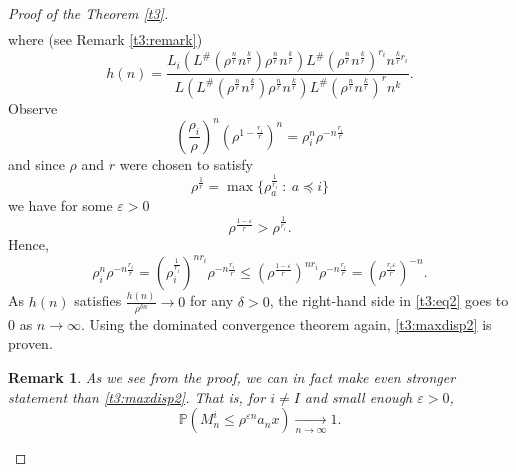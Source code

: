 \documentclass[12pt]{article}
\numberwithin{equation}{section}
\newtheorem{remark}[theorem]{Remark}
\begin{document}
\begin{proof}[Proof of the Theorem \ref{t3}]
\begin{align}
\end{align}
where (see Remark \ref{t3:remark}) \[
h(n) = \frac{ L_i\left( L^{\#}\left( \rho^{\frac n r} n^{\frac k r}\right)\rho^{\frac n r} n^{\frac k r}\right) L^{\#}\left( \rho^{\frac n r} n^{\frac k r}\right)^{r_i}n^{\frac k r r_i}} {L\left( L^{\#}\left( \rho^{\frac n r} n^{\frac k r}\right)\rho^{\frac n r} n^{\frac k r}\right) L^{\#}\left( \rho^{\frac n r} n^{\frac k r}\right)^{r}n^{ k }}.
\] 
Observe 
\[
\left(\frac {\rho_i} {\rho} \right)^n \left(\rho^{1-\frac { r_i} {r}  }\right)^n  =\rho_i^n \rho^{-n\frac {r_i} r}
\]
and since $\rho$ and $r$ were chosen to satisfy
\[
   \rho^{\frac 1 r} = \max{\{\rho_a^{\frac 1 {r_i}} \ : \ a \preceq i \}}
\]
we have for some $\varepsilon > 0$
\[
\rho^{\frac {1-\varepsilon} r} > \rho^{\frac 1 {r_i}}.
\]
Hence,
\[ \rho_i^n \rho^{-n\frac {r_i} r} = \left(\rho_i^{\frac 1 {r_i}}\right)^{n r_i} \rho^{-n\frac {r_i} r} \leq \left(\rho^{\frac {1- \varepsilon} {r}}\right)^{n r_i}\rho^{-n\frac {r_i} r} = \left(\rho^{\frac {r_i \varepsilon} r}\right)^{-n}. \] As $h(n)$ satisfies $\frac {h(n)} {\rho^{\delta n}} \rightarrow 0$ for any $\delta>0$, the right-hand side in \eqref{t3:eq2} goes to 0 as $n \rightarrow \infty$. Using the dominated convergence theorem again, \eqref{t3:maxdisp2} is proven.
\begin{remark}\label{t3:remark2}\emph{
As we see from the proof, we can in fact make even stronger statement than \eqref{t3:maxdisp2}. That is, for $i\neq I$ and small enough $\varepsilon >0$,
\begin{equation*}
        \mathbb{P}\left(M^i_n \leq \rho^{\varepsilon n}a_n x\right) \xrightarrow[ n \rightarrow \infty]{} 1.
\end{equation*}
}
\end{remark}



\end{proof}
\end{document}
